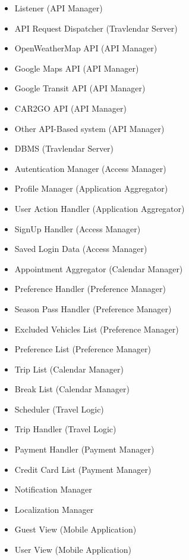 \begin{itemize}
	\item	 Listener								(API Manager)
	\item API Request Dispatcher		(Travlendar Server)
	\item	 OpenWeatherMap API 			(API Manager)
	\item Google Maps API					(API Manager)
	\item Google Transit API				(API Manager)
	\item CAR2GO API							(API Manager)
	\item Other API-Based system		(API Manager)
	\item DBMS									(Travlendar Server)
	\item Autentication Manager          (Access Manager)
	\item Profile Manager					(Application Aggregator)
	\item User Action Handler				(Application Aggregator)
	\item SignUp Handler 					(Access Manager)
	\item Saved Login Data   				(Access Manager)
	\item Appointment Aggregator		(Calendar Manager)
	\item Preference Handler				(Preference Manager)
	\item Season Pass Handler			(Preference Manager)
	\item Excluded Vehicles List			(Preference Manager)
	\item Preference List						(Preference Manager)
	\item Trip List								(Calendar Manager)
	\item Break List								(Calendar Manager)
	\item Scheduler 							(Travel Logic)
	\item Trip Handler							(Travel Logic)
	\item Payment Handler					(Payment Manager)
	\item Credit Card List					(Payment Manager)
	\item Notification Manager
	\item Localization Manager
	\item Guest View 							(Mobile Application)
	\item User View								(Mobile Application)
\end{itemize}